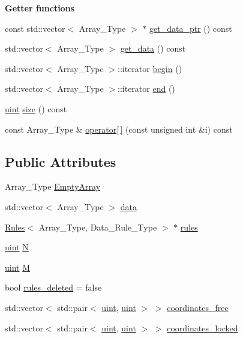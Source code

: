 \begin{Indent}\textbf{ Getter functions}\par
\begin{DoxyCompactItemize}
\item 
const std\+::vector$<$ Array\+\_\+\+Type $>$ $\ast$ \hyperlink{class_power_set_a99cf1aa56e63a16c023bf7057b0b9288}{get\+\_\+data\+\_\+ptr} () const
\item 
std\+::vector$<$ Array\+\_\+\+Type $>$ \hyperlink{class_power_set_a4de44631d9a7967db4dd791d42166115}{get\+\_\+data} () const
\item 
std\+::vector$<$ Array\+\_\+\+Type $>$\+::iterator \hyperlink{class_power_set_abed9d58db924366d8a38baf168131fc3}{begin} ()
\item 
std\+::vector$<$ Array\+\_\+\+Type $>$\+::iterator \hyperlink{class_power_set_ac734ed684aa314b722a05d423c607a38}{end} ()
\item 
\hyperlink{typedefs_8hpp_a91ad9478d81a7aaf2593e8d9c3d06a14}{uint} \hyperlink{class_power_set_a80e7099e115369326e6c873a92d270f9}{size} () const
\item 
const Array\+\_\+\+Type \& \hyperlink{class_power_set_acc822131a9fbfd5b87f85b675f293d39}{operator\mbox{[}$\,$\mbox{]}} (const unsigned int \&i) const
\end{DoxyCompactItemize}
\end{Indent}
\subsection*{Public Attributes}
\begin{DoxyCompactItemize}
\item 
Array\+\_\+\+Type \hyperlink{class_power_set_a367db2c97e0301dd0dd78e5e4b458d34}{Empty\+Array}
\item 
std\+::vector$<$ Array\+\_\+\+Type $>$ \hyperlink{class_power_set_af456c157d157692ba5890c549c51af75}{data}
\item 
\hyperlink{class_rules}{Rules}$<$ Array\+\_\+\+Type, Data\+\_\+\+Rule\+\_\+\+Type $>$ $\ast$ \hyperlink{class_power_set_afa542ecc31858c8644d1e76078eb1713}{rules}
\item 
\hyperlink{typedefs_8hpp_a91ad9478d81a7aaf2593e8d9c3d06a14}{uint} \hyperlink{class_power_set_ab3b65c1b9bce012f4aabe5acae093acd}{N}
\item 
\hyperlink{typedefs_8hpp_a91ad9478d81a7aaf2593e8d9c3d06a14}{uint} \hyperlink{class_power_set_a91d328d5ace1ed6a8587a66af905ae98}{M}
\item 
bool \hyperlink{class_power_set_a08b6baf1e244e023d997ddaecbc2116f}{rules\+\_\+deleted} = false
\item 
std\+::vector$<$ std\+::pair$<$ \hyperlink{typedefs_8hpp_a91ad9478d81a7aaf2593e8d9c3d06a14}{uint}, \hyperlink{typedefs_8hpp_a91ad9478d81a7aaf2593e8d9c3d06a14}{uint} $>$ $>$ \hyperlink{class_power_set_a99cfef97c3a457ea7be1b000b39f41d9}{coordinates\+\_\+free}
\item 
std\+::vector$<$ std\+::pair$<$ \hyperlink{typedefs_8hpp_a91ad9478d81a7aaf2593e8d9c3d06a14}{uint}, \hyperlink{typedefs_8hpp_a91ad9478d81a7aaf2593e8d9c3d06a14}{uint} $>$ $>$ \hyperlink{class_power_set_ac5cdec06502e8bd20e36fca3abbb9a3e}{coordinates\+\_\+locked}
\end{DoxyCompactItemize}


